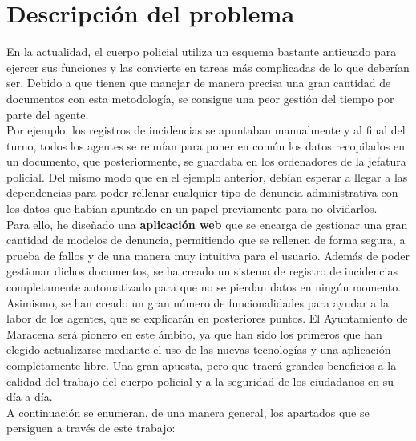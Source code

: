 \chapter{Descripción del problema}

En la actualidad, el cuerpo policial utiliza un esquema bastante anticuado para ejercer sus funciones y las convierte en tareas más complicadas de lo que deberían ser. Debido a que tienen 
que manejar de manera precisa una gran cantidad de documentos con esta metodología, se consigue una peor gestión del tiempo por parte del agente.\\

Por ejemplo, los registros de incidencias se apuntaban manualmente y al final del turno, todos los agentes se reunían para poner 
en común los datos recopilados en un documento, que posteriormente, se guardaba en los ordenadores de la jefatura policial. Del mismo modo que en el ejemplo anterior, debían 
esperar a llegar a las dependencias para poder rellenar cualquier tipo de denuncia administrativa con los datos que habían
apuntado en un papel previamente para no olvidarlos.\\

Para ello, he diseñado una \textbf{aplicación web} que se encarga de gestionar una gran cantidad de 
modelos de denuncia, permitiendo que se rellenen de forma segura, a prueba de 
fallos y de una manera muy intuitiva para el usuario. Además de poder gestionar dichos documentos,
se ha creado un sistema de registro de incidencias completamente automatizado para que no se pierdan datos en ningún momento. Asimismo, se han creado un gran número de funcionalidades para ayudar a la labor de los agentes, que se explicarán en 
posteriores puntos. El Ayuntamiento de Maracena será pionero en este ámbito, ya que han sido los 
primeros que han elegido actualizarse mediante el uso de las nuevas tecnologías y una aplicación completamente libre. Una gran apuesta, pero que traerá grandes
beneficios a la calidad del trabajo del cuerpo policial y a la seguridad de los ciudadanos en su día a día. \\

A continuación se enumeran, de una manera general, los apartados que se persiguen a través de este trabajo:

